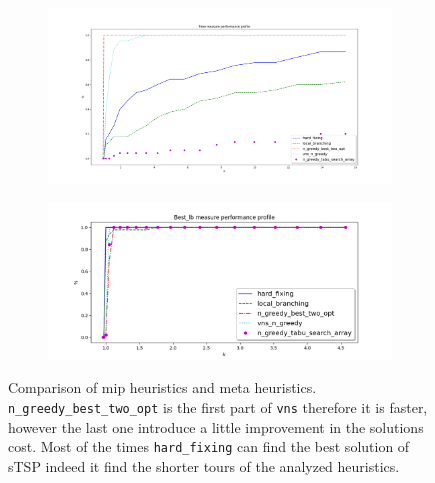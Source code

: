 \begin{figure}[h]
	\centering
	\begin{subfigure}{\columnwidth}
		\includegraphics[width=\columnwidth]{../res/Lmip_meta_LA_time.png}
		\caption{}
		\label{fig:Lmip_meta_LA_time}
	\end{subfigure}
	\begin{subfigure}{\columnwidth}
		\includegraphics[width=\columnwidth]{../res/Lmip_meta_LA_lb.png}
		\caption{}
		\label{fig:Lmip_meta_LA_lb}
	\end{subfigure}
\caption{Comparison of mip heuristics and meta heuristics. \texttt{n\_greedy\_best\_two\_opt} is the first part of \texttt{vns} therefore it is faster, however the last one introduce a little improvement in the solutions cost. Most of the times \texttt{hard\_fixing} can find the best solution of sTSP indeed it find the shorter tours of the analyzed heuristics. }
\label{fig:Lmip_meta_LA}
\end{figure}


